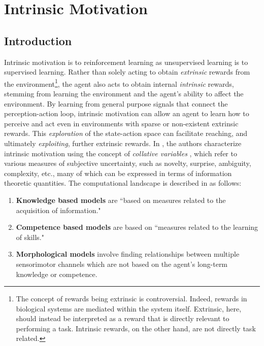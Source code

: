 \chapter{Intrinsic Motivation}

\section{Introduction}

Intrinsic motivation is to reinforcement learning as unsupervised learning is to supervised learning. Rather than solely acting to obtain \textit{extrinsic} rewards from the environment\footnote{The concept of rewards being extrinsic is controversial. Indeed, rewards in biological systems are mediated within the system itself. Extrinsic, here, should instead be interpreted as a reward that is directly relevant to performing a task. Intrinsic rewards, on the other hand, are not directly task related.}, the agent also acts to obtain internal \textit{intrinsic} rewards, stemming from learning the environment and the agent's ability to affect the environment. By learning from general purpose signals that connect the perception-action loop, intrinsic motivation can allow an agent to learn how to perceive and act even in environments with sparse or non-existent extrinsic rewards. This \textit{exploration} of the state-action space can facilitate reaching, and ultimately \textit{exploiting}, further extrinsic rewards. In \cite{oudeyer2008can}, the authors characterize intrinsic motivation using the concept of \textit{collative variables} \cite{berlyne1965structure}, which refer to various measures of subjective uncertainty, such as novelty, surprise, ambiguity, complexity, etc., many of which can be expressed in terms of information theoretic quantities. The computational landscape is described in \cite{oudeyer2008can, mirolli2013intrinsically, baldassarre2014intrinsic} as follows:
\begin{enumerate}
	\item \textbf{Knowledge based models} are ``based on measures related to the acquisition of information." \cite{baldassarre2014intrinsic}
	\item \textbf{Competence based models} are based on ``measures related to the learning of skills." \cite{baldassarre2014intrinsic}
	\item \textbf{Morphological models} involve finding relationships between multiple sensorimotor channels which are not based on the agent's long-term knowledge or competence.
\end{enumerate}
